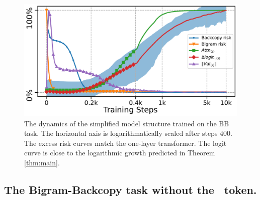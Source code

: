 \begin{figure}[h]
  \centering
      \includegraphics[width=.7\linewidth]{Figures/BBM_appendix/simple_dynamics_combine.pdf}
  \caption{\small The dynamics of the simplified model structure trained on the BB task. The horizontal axis is logarithmatically scaled after steps $400$. The excess risk curves match the one-layer transformer. The logit curve is close to the logarithmic growth predicted in Theorem \ref{thm:main}.}
  \label{appfigure:simple-dynamic}
  \vspace{-1em}
\end{figure}

\subsection{The Bigram-Backcopy task without the \bos~token.}

